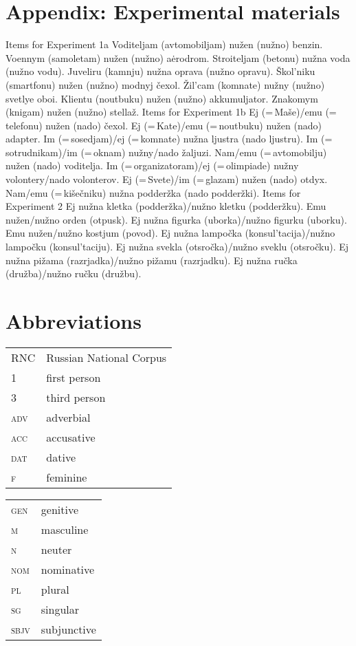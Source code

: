 \documentclass[output=paper]{langscibook}
\begin{document}
\section*{Appendix: Experimental materials}

\ea Items for Experiment 1a
\ea Voditeljam (avtomobiljam) nužen (nužno) benzin.
\ex  Voennym (samoletam) nužen (nužno) aėrodrom.
\ex  Stroiteljam (betonu) nužna voda (nužno vodu).
\ex  Juveliru (kamnju) nužna oprava (nužno opravu).
\ex  Škol'niku (smartfonu) nužen (nužno) modnyj čexol.
\ex  Žil'cam (komnate) nužny (nužno) svetlye oboi.
\ex  Klientu (noutbuku) nužen (nužno) akkumuljator.
\ex  Znakomym (knigam) nužen (nužno) stellaž.
\z \ex Items for Experiment 1b
\ea Ej (=\,Maše)\slash emu (=\,telefonu) nužen (nado) čexol.
\ex Ej (=\,Kate)\slash emu (=\,noutbuku) nužen (nado) adapter.
\ex  Im (=\,sosedjam)\slash ej (=\,komnate) nužna ljustra (nado ljustru).
\ex  Im (=\,sotrudnikam)\slash im (=\,oknam) nužny\slash nado žaljuzi.
\ex  Nam\slash emu (=\,avtomobilju) nužen (nado) voditelja.
\ex  Im (=\,organizatoram)\slash ej (=\,olimpiade) nužny volontery\slash nado volonterov.
\ex  Ej (=\,Svete)\slash im (=\,glazam) nužen (nado) otdyx.
\ex  Nam\slash emu (=\,kišečniku) nužna podderžka (nado podderžki).
\z \ex Items for Experiment 2
\ea Ej nužna kletka (podderžka)\slash nužno  kletku (podderžku).
\ex Emu nužen\slash nužno  orden (otpusk).
\ex Ej nužna figurka (uborka)\slash nužno  figurku (uborku).
\ex Emu nužen\slash nužno  kostjum (povod).
\ex Ej nužna lampočka (konsul'tacija)\slash nužno  lampočku (konsul'taciju).
\ex Ej nužna svekla (otsročka)\slash nužno  sveklu (otsročku).
\ex Ej nužna pižama (razrjadka)\slash nužno  pižamu (razrjadku).
\ex Ej nužna ručka (družba)\slash nužno  ručku (družbu).
\z \z

\section*{Abbreviations}

\begin{tabularx}{.5\textwidth}{@{}lX}
RNC & Russian National Corpus\\
\textsc{1} & first person\\
\textsc{3} & third person\\
\textsc{adv} & adverbial\\
\textsc{acc} & accusative\\
\textsc{dat} & dative\\
\textsc{f} & feminine\\
\end{tabularx}%
\begin{tabularx}{.5\textwidth}{lX@{}}
\textsc{gen} & genitive\\
\textsc{m} & masculine\\
\textsc{n} & neuter\\
\textsc{nom} & nominative\\
\textsc{pl} & plural\\
\textsc{sg} & singular\\
\textsc{sbjv} & subjunctive\\ %
\end{tabularx}
\end{document}
